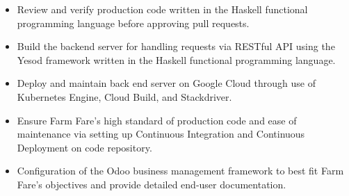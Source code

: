 \documentclass[10pt,a4paper]{altacv}
\begin{document}

\begin{fullwidth}
\makecvheader
\end{fullwidth}





\small{
\begin{itemize}
\item Review and verify production code written in the Haskell functional programming language before approving pull requests.

\item Build the backend server for handling requests via RESTful API using the Yesod framework written in the Haskell functional programming language.

\item Deploy and maintain back end server on Google Cloud through use of Kubernetes Engine, Cloud Build, and Stackdriver.

\item Ensure Farm Fare's high standard of production code and ease of maintenance via setting up Continuous Integration and Continuous Deployment on code repository. 

\item Configuration of the Odoo business management framework to best fit Farm Fare's objectives and provide detailed end-user documentation.

\end{itemize}
}
\end{document}

